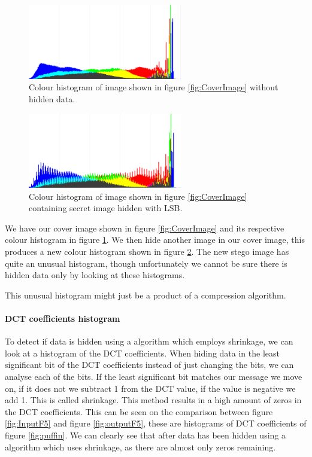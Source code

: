\begin{figure}
	\centering
	\includegraphics[width=0.6\textwidth]{figures/HistoLSBCat.png}
	\caption{Colour histogram of image shown in figure \ref{fig:CoverImage} without hidden data.}
	\label{fig:HistoWithoutLSB}
\end{figure}

\begin{figure}
	\centering
	\includegraphics[width=0.6\textwidth]{figures/HistoLSBCatEncrypted.png}
	\caption{Colour histogram of image shown in figure \ref{fig:CoverImage} containing secret image hidden with LSB.}
	\label{fig:HistoWithLSB}
\end{figure}

We have our cover image shown in figure \ref{fig:CoverImage} and its respective colour histogram in figure \ref{fig:HistoWithoutLSB}.
We then hide another image in our cover image, this produces a new colour histogram shown in figure \ref{fig:HistoWithLSB}.
The new stego image has quite an unusual histogram, though unfortunately we cannot be sure there is hidden data only by looking at these histograms.

This unusual histogram might just be a product of a compression algorithm.

\paragraph*{DCT coefficients histogram}
To detect if data is hidden using a algorithm which employs shrinkage, we can look at a histogram of the DCT coefficients.
When hiding data in the least significant bit of the DCT coefficients instead of just changing the bits, we can analyse each of the bits.
If the least significant bit matches our message we move on, if it does not we subtract 1 from the DCT value, if the value is negative we add 1.
This is called shrinkage.
This method results in a high amount of zeros in the DCT coefficients.
This can be seen on the comparison between figure \ref{fig:InputF5} and figure \ref{fig:outputF5}, these are histograms of DCT coefficients of figure \ref{fig:puffin}.
We can clearly see that after data has been hidden using a algorithm which uses shrinkage, as there are almost only zeros remaining.

